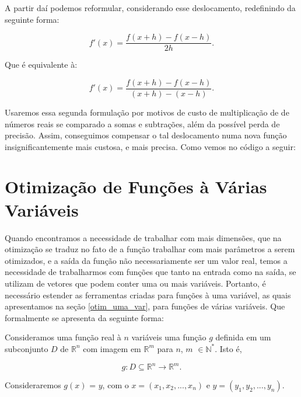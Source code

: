 A partir daí podemos reformular, considerando esse deslocamento, redefinindo
da seguinte forma:


\begin{equation}
    f'(x) = \frac{f(x + h) - f(x - h)}{2h}.
\end{equation}

Que é equivalente à:

\begin{equation}
    f'(x) = \frac{f(x + h) - f(x - h)}{(x + h) - (x - h)}.
\end{equation}


Usaremos essa segunda formulação por motivos de custo de multiplicação de de
números reais se comparado a somas e subtrações, além da possível perda de
precisão. Assim, conseguimos compensar o tal deslocamento numa nova função
insignificantemente mais custosa, e mais precisa. Como vemos no código a seguir:




\section{{Otimização de Funções à Várias Variáveis}}

\hspace{0.8cm}
Quando encontramos a necessidade de trabalhar com mais dimensões, que na
otimização se traduz no fato de a função trabalhar com mais parâmetros a serem
otimizados, e a saída da função não necessariamente ser um valor real,
temos a necessidade de trabalharmos com funções que tanto na entrada como na
saída, se utilizam de vetores que podem conter uma ou mais variáveis. Portanto,
é necessário estender as ferramentas criadas para funções à uma variável, as
quais apresentamos na seção \ref{otim_uma_var}, para funções de várias
variáveis. Que formalmente se apresenta da seguinte forma:

\begin{definition}
    Consideramos uma função real à $n$ variáveis uma função $g$ definida em um
    subconjunto $D$ de \(\mathbb{R}^n\) com imagem em \(\mathbb{R}^m\) para
    $n$, $m$ \(\in \mathbb{N^*}\). Isto é,

    \begin{equation}
            g: D \subseteq \mathbb{R}^n \rightarrow \mathbb{R}^m.
    \end{equation}

    Consideraremos $g(x)$ = $y$, com o $x=(x_1, x_2, ..., x_n)$
    e $y=(y_1, y_2, ..., y_n)$.

\end{definition}



